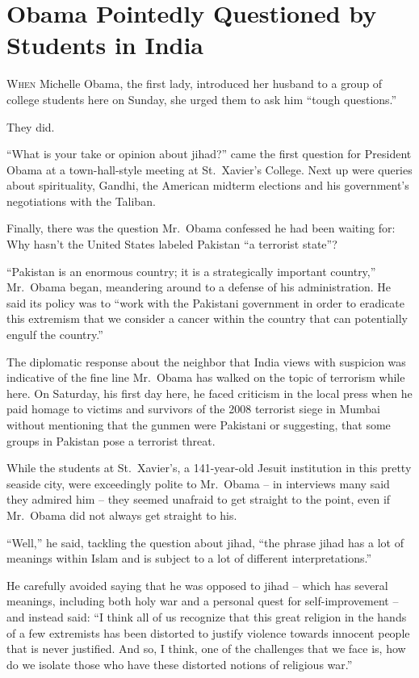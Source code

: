 ﻿\documentclass[12pt]{article}
\begin{document}
\section{Obama Pointedly Questioned by Students in India}

\lettrine{W}{hen} Michelle Obama, the first lady, introduced her husband to
a group of college students here on Sunday, she urged them to ask him ``tough questions.''

They did.

``What is your take or opinion about jihad?'' came the first question for President Obama at a
town-hall-style meeting at St.~Xavier's College. Next up were queries about spirituality, Gandhi,
the American midterm elections and his government's negotiations with the Taliban.

Finally, there was the question Mr.~Obama confessed he had been waiting for: Why hasn't the United
States labeled Pakistan ``a terrorist state''?

``Pakistan is an enormous country; it is a strategically important country,'' Mr.~Obama began,
meandering around to a defense of his administration. He said its policy was to ``work with the
Pakistani government in order to eradicate this extremism that we consider a cancer within the
country that can potentially engulf the country.''

The diplomatic response about the neighbor that India views with suspicion was indicative of the
fine line Mr.~Obama has walked on the topic of terrorism while here. On Saturday, his first day
here, he faced criticism in the local press when he paid homage to victims and survivors of the 2008
terrorist siege in Mumbai without mentioning that the gunmen were Pakistani or suggesting, that some
groups in Pakistan pose a terrorist threat.

While the students at St.~Xavier's, a 141-year-old Jesuit institution in this pretty seaside city,
were exceedingly polite to Mr.~Obama -- in interviews many said they admired him -- they seemed
unafraid to get straight to the point, even if Mr.~Obama did not always get straight to his.

``Well,'' he said, tackling the question about jihad, ``the phrase jihad has a lot of meanings
within Islam and is subject to a lot of different interpretations.''

He carefully avoided saying that he was opposed to jihad -- which has several meanings, including
both holy war and a personal quest for self-improvement -- and instead said: ``I think all of us
recognize that this great religion in the hands of a few extremists has been distorted to justify
violence towards innocent people that is never justified. And so, I think, one of the challenges
that we face is, how do we isolate those who have these distorted notions of religious war.''
\end{document}
